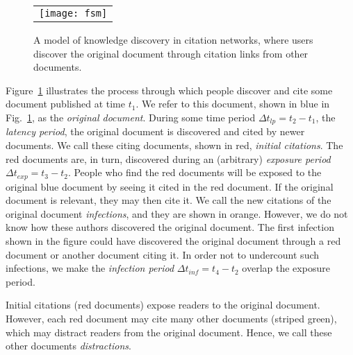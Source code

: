 \documentclass[10pt]{bmc_article}
\newenvironment{bmcformat}{\baselineskip20pt\sloppy\setboolean{publ}{false}}{\baselineskip20pt\sloppy}
\begin{document}
\begin{bmcformat}
\begin{figure} [!ht]
   \centering
      \begin{tabular}{c}
   \texttt{[image: fsm]} \\
   \end{tabular}
 \caption{A model of knowledge discovery in citation networks, where users discover the original document through citation links from other documents. \label{fig:fsm-schematic}}
\end{figure}


Figure~\ref{fig:fsm-schematic} illustrates the process through which people discover and cite some document published at time $t_1$. We refer to this document, shown in blue in Fig.~\ref{fig:fsm-schematic}, as the \emph{original document}. During some time period $\Delta t_{lp}=t_2 - t_1$, the \emph{latency period}, the original document is discovered and cited by newer documents. We call these citing documents, shown in red, \emph{initial citations}. The red documents are, in turn, discovered during an (arbitrary) \emph{exposure period} $\Delta t_{exp}=t_3 - t_2$. People who find the red documents will be exposed to the original blue document by seeing it cited in the red document. If the original document is relevant, they may then cite it. We call the new citations of the original document \emph{infections}, and they are shown in orange. However, we do not know how these authors discovered the original document. The first infection shown in the figure could have discovered the original document through a red document or another document citing it. In order not to undercount such infections, we make the \emph{infection period} $\Delta t_{inf}=t_4 - t_2$ overlap the exposure period.

Initial citations (red documents) expose readers to the original document. However, each red document may cite many other documents (striped green), which may distract readers from the original document. Hence, we call these other documents \emph{distractions}.

\begin{comment}
\begin{figure} [!ht]
   \centering
      \begin{tabular}{c}
      \texttt{[image: Figures/bsm]} \\
   \end{tabular}
 \caption{Backward Search Model knowledge discovery in citation networks, where users discover a document to cite by tracing from the document's references. \label{fig:bsm-schematic}}
\end{figure}



\end{comment}
\end{bmcformat}
\end{document}
